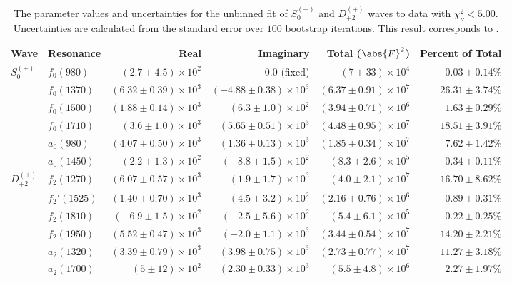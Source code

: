 \begin{table}[ht]
    \begin{center}
        \begin{tabular}{llrrrr}\toprule
        Wave & Resonance & Real & Imaginary & Total ($\abs{F}^2$) & Percent of Total \\\midrule
$S_{0}^{(+)}$ & $f_{0}(980)$ & $(2.7 \pm 4.5) \times 10^{2}$ & $0.0$ (fixed) & $(7 \pm 33) \times 10^{4}$ & $0.03 \pm 0.14 \%$ \\
 & $f_{0}(1370)$ & $(6.32 \pm 0.39) \times 10^{3}$ & $(-4.88 \pm 0.38) \times 10^{3}$ & $(6.37 \pm 0.91) \times 10^{7}$ & $26.31 \pm 3.74 \%$ \\
 & $f_{0}(1500)$ & $(1.88 \pm 0.14) \times 10^{3}$ & $(6.3 \pm 1.0) \times 10^{2}$ & $(3.94 \pm 0.71) \times 10^{6}$ & $1.63 \pm 0.29 \%$ \\
 & $f_{0}(1710)$ & $(3.6 \pm 1.0) \times 10^{3}$ & $(5.65 \pm 0.51) \times 10^{3}$ & $(4.48 \pm 0.95) \times 10^{7}$ & $18.51 \pm 3.91 \%$ \\
 & $a_{0}(980)$ & $(4.07 \pm 0.50) \times 10^{3}$ & $(1.36 \pm 0.13) \times 10^{3}$ & $(1.85 \pm 0.34) \times 10^{7}$ & $7.62 \pm 1.42 \%$ \\
 & $a_{0}(1450)$ & $(2.2 \pm 1.3) \times 10^{2}$ & $(-8.8 \pm 1.5) \times 10^{2}$ & $(8.3 \pm 2.6) \times 10^{5}$ & $0.34 \pm 0.11 \%$ \\
$D_{+2}^{(+)}$ & $f_{2}(1270)$ & $(6.07 \pm 0.57) \times 10^{3}$ & $(1.9 \pm 1.7) \times 10^{3}$ & $(4.0 \pm 2.1) \times 10^{7}$ & $16.70 \pm 8.62 \%$ \\
 & $f_{2}'(1525)$ & $(1.40 \pm 0.70) \times 10^{3}$ & $(4.5 \pm 3.2) \times 10^{2}$ & $(2.16 \pm 0.76) \times 10^{6}$ & $0.89 \pm 0.31 \%$ \\
 & $f_{2}(1810)$ & $(-6.9 \pm 1.5) \times 10^{2}$ & $(-2.5 \pm 5.6) \times 10^{2}$ & $(5.4 \pm 6.1) \times 10^{5}$ & $0.22 \pm 0.25 \%$ \\
 & $f_{2}(1950)$ & $(5.52 \pm 0.47) \times 10^{3}$ & $(-2.0 \pm 1.1) \times 10^{3}$ & $(3.44 \pm 0.54) \times 10^{7}$ & $14.20 \pm 2.21 \%$ \\
 & $a_{2}(1320)$ & $(3.39 \pm 0.79) \times 10^{3}$ & $(3.98 \pm 0.75) \times 10^{3}$ & $(2.73 \pm 0.77) \times 10^{7}$ & $11.27 \pm 3.18 \%$ \\
 & $a_{2}(1700)$ & $(5 \pm 12) \times 10^{2}$ & $(2.30 \pm 0.33) \times 10^{3}$ & $(5.5 \pm 4.8) \times 10^{6}$ & $2.27 \pm 1.97 \%$ \\\bottomrule
        \end{tabular}
    \caption{The parameter values and uncertainties for the unbinned fit of $S_{0}^{(+)}$ and $D_{+2}^{(+)}$ waves to data with $\chi^2_\nu < 5.00$. Uncertainties are calculated from the standard error over $100$ bootstrap iterations. This result corresponds to .}\label{tab:unbinned-fit-chisqdof-5.0-Sp0p-Dp2p}
    \end{center}
\end{table}
